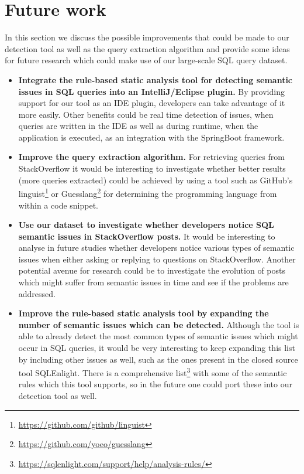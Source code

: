 \section{Future work}

In this section we discuss the possible improvements that could be made to our detection tool as well as the query extraction algorithm and provide some ideas for future research which could make use of our large-scale SQL query dataset.

\begin{itemize}
    \item \textbf{Integrate the rule-based static analysis tool for detecting semantic issues in SQL queries into an IntelliJ/Eclipse plugin.} By providing support for our tool as an IDE plugin, developers can take advantage of it more easily. Other benefits could be real time detection of issues, when queries are written in the IDE as well as during runtime, when the application is executed, as an integration with the SpringBoot framework.
    \item \textbf{Improve the query extraction algorithm.} For retrieving queries from StackOverflow it would be interesting to investigate whether better results (more queries extracted) could be achieved by using a tool such as GitHub’s linguist\footnote{\url{https://github.com/github/linguist}} or Guesslang\footnote{\url{https://github.com/yoeo/guesslang}} for determining the programming language from within a code snippet.
    \item \textbf{Use our dataset to investigate whether developers notice SQL semantic issues in StackOverflow posts.} It would be interesting to analyse in future studies whether developers notice various types of semantic issues when either asking or replying to questions on StackOverflow. Another potential avenue for research could be to investigate the evolution of posts which might suffer from semantic issues in time and see if the problems are addressed.
    \item \textbf{Improve the rule-based static analysis tool by expanding the number of semantic issues which can be detected.} Although the tool is able to already detect the most common types of semantic issues which might occur in SQL queries, it would be very interesting to keep expanding this list by including other issues as well, such as the ones present in the closed source tool SQLEnlight. There is a comprehensive list\footnote{\url{https://sqlenlight.com/support/help/analysis-rules/}} with some of the semantic rules which this tool supports, so in the future one could port these into our detection tool as well.
\end{itemize}

